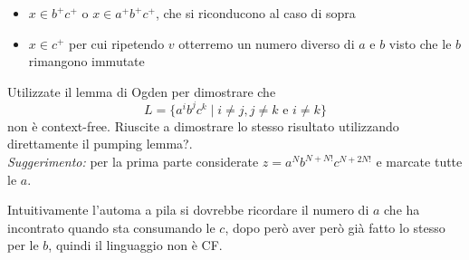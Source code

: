 \documentclass[12pt, answers]{exam}
\begin{document}
\begin{questions}
\begin{solution}
\begin{itemize}
\begin{itemize}
					\begin{itemize}
						\item $x \in b^+ c^+$ o $x \in a^+ b^+ c^+$, che si riconducono al caso di sopra
						\item $x \in c^+$ per cui ripetendo $v$ otterremo un numero diverso di $a$ e $b$ visto che le $b$ rimangono immutate
					\end{itemize}
			\end{itemize}
	\end{itemize}
	\end{solution}
	\question Utilizzate il lemma di Ogden per dimostrare che 
	$$ L = \{ a^i b^j c^k \mid i \neq j, j \neq k \text{ e } i \neq k \} $$
	non è context-free.
	Riuscite a dimostrare lo stesso risultato utilizzando direttamente il pumping lemma?.\\
	\textit{Suggerimento:} per la prima parte considerate $z = a^N b^{N + N!} c^{N + 2N!}$ e marcate tutte le $a$.
	\begin{solution}
		Intuitivamente l'automa a pila si dovrebbe ricordare il numero di $a$ che ha incontrato quando sta consumando le $c$, dopo però aver però già fatto lo stesso per le $b$, quindi il linguaggio non è CF.
			

\end{solution}
\end{questions}
\end{document}
